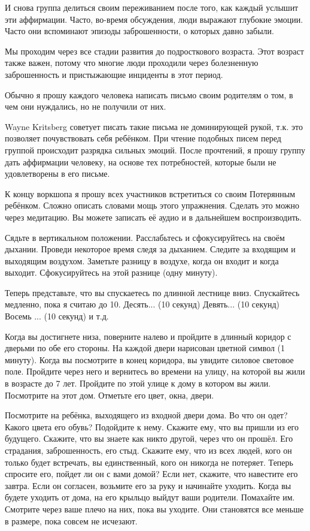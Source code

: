 \documentclass[10pt, fleqn]{article}
\begin{document}
И снова группа делиться своим переживанием после того, как каждый услышит эти аффирмации. Часто, во-время обсуждения, люди выражают глубокие эмоции. Часто они вспоминают эпизоды заброшенности, о которых давно забыли.

Мы проходим через все стадии развития до подросткового возраста. Этот возраст также важен, потому что многие люди проходили через болезненную заброшенность и пристыжающие инциденты в этот период.

Обычно я прошу каждого человека написать письмо своим родителям о том, в чем они нуждались, но не получили от них.

Wayne Kritsberg советует писать такие письма не доминирующей рукой, т.к. это позволяет почувствовать себя ребёнком. При чтение подобных писем перед группой происходит разрядка сильных эмоций. После прочтений, я прошу группу дать аффирмации человеку, на основе тех потребностей, которые были не удовлетворены в его письме.

К концу воркшопа я прошу всех участников встретиться со своим Потерянным ребёнком. Сложно описать словами мощь этого упражнения. Сделать это можно через медитацию. Вы можете записать её аудио и в дальнейшем воспроизводить.



Сядьте в вертикальном положении. Расслабьтесь и сфокусируйтесь на своём дыхании. Проведи некоторое время следя за дыханием. Следите за входящим и выходящим воздухом. Заметьте разницу в воздухе, когда он входит и когда выходит. Сфокусируйтесь на этой разнице (одну минуту).

Теперь представьте, что вы спускаетесь по длинной лестнице вниз. Спускайтесь медленно, пока я считаю до 10. Десять... (10 секунд) Девять... (10 секунд) Восемь ... (10 секунд) и т.д.

Когда вы достигнете низа, поверните налево и пройдите в длинный коридор с дверьми по обе его стороны. На каждой двери нарисован цветной символ (1 минуту). Когда вы посмотрите в конец коридора, вы увидите силовое световое поле. Пройдите через него и вернитесь во времени на улицу, на которой вы жили в возрасте до 7 лет. Пройдите по этой улице к дому в котором вы жили. Посмотрите на этот дом. Отметьте его цвет, окна, двери.

Посмотрите на ребёнка, выходящего из входной двери дома. Во что он одет? Какого цвета его обувь? Подойдите к нему. Скажите ему, что вы пришли из его будущего. Скажите, что вы знаете как никто другой, через что он прошёл. Его страдания, заброшенность, его стыд. Скажите ему, что из всех людей, кого он только будет встречать, вы единственный, кого он никогда не потеряет. Теперь спросите его, пойдет ли он с вами домой? Если нет, скажите, что навестите его завтра. Если он согласен, возьмите его за руку и начинайте уходить. Когда вы будете уходить от дома, на его крыльцо выйдут ваши родители. Помахайте им. Смотрите через ваше плечо на них, пока вы уходите. Они становятся все меньше в размере, пока совсем не исчезают.
\end{document}
